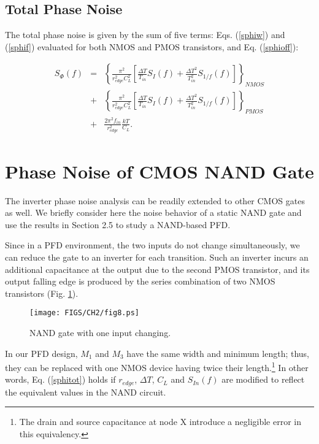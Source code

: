 \subsection{Total Phase Noise}
The total phase noise is given by the sum of five terms: Eqs. (\ref{sphiw}) and (\ref{sphif}) evaluated for both NMOS and PMOS transistors, and
Eq. (\ref{sphioff}):

\begin{eqnarray}
S_{\Phi}(f)&=& \left\{\frac{\pi^2}{r_{edge}^2 C_L^2}[\frac{{\Delta T}}{T_{in}}S_{I}(f)+\frac{{\Delta T}^2}{T_{in}^2}S_{1/f}(f)]\right\}_{NMOS} \nonumber  \\ 
&+&\left\{\frac{\pi^2}{r_{edge}^2 C_L^2}[\frac{{\Delta T}}{T_{in}}S_{I}(f)+\frac{{\Delta T}^2}{T_{in}^2}S_{1/f}(f)]\right\}_{PMOS} \nonumber  \\ 
&+&\frac{2 \pi^2 f_{in}}{r_{edge}^2}\frac{kT}{C_L}.
\label{sphitot}
\end{eqnarray}




\section{Phase Noise of CMOS NAND Gate}
The inverter phase noise analysis can be readily extended to other CMOS gates as well. We briefly consider here the noise behavior of a static NAND
gate and use the results in Section 2.5 to study a NAND-based PFD.

Since in a PFD environment, the two inputs do not change simultaneously, we can reduce the gate to an inverter for each transition. Such an inverter
incurs an additional capacitance at the output due to the second PMOS transistor, and its output falling edge is produced by the series combination
of two NMOS transistors (Fig. \ref{fig:nand}).

\begin{figure}[htb!]
\centering
\texttt{[image: FIGS/CH2/fig8.ps]}
\caption{NAND gate with one input changing.}
\label{fig:nand}
\end{figure}

In our PFD design, $M_1$ and $M_3$ have the same width and minimum length; thus, they can be replaced with one NMOS device having twice their
length.\footnote{The drain and source capacitance at node X introduce a negligible error in this equivalency.}
In other words, Eq. (\ref{sphitot}) holds if $r_{edge}$, $\Delta T$, $C_L$ and $S_{In}(f)$ are modified to reflect the equivalent values
in the NAND circuit.




